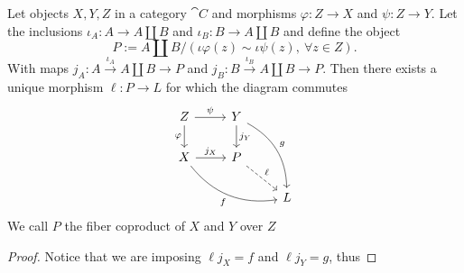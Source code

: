 \begin{proposition}
   Let objects \(X, Y, Z\) in a category \(\cat C\) and morphisms \(\varphi : Z
   \to X\) and \(\psi : Z \to Y\). Let the inclusions \(\iota_A : A \to A \amalg
   B\) and  \(\iota_B: B \to A \amalg B\) and define the object
    \[
       P := A \amalg B / (\iota  \varphi(z) \sim \iota  \psi(z),\
       \forall z \in Z).
   \]
   With maps \(j_A : A \xrightarrow{\iota_A} A \amalg B \to P\) and  \(j_B : B
   \xrightarrow{\iota_B} A \amalg B \to P\). Then there exists a unique morphism
    \(\ell : P \to L\) for which the diagram commutes
     \[
       \begin{tikzcd}
         Z
         \ar[r, "\psi"]
         \ar[d, swap, "\varphi"]
           &Y
           \ar[d, "j_Y"]
           \ar[ddr, bend left, "g"]
             &\\
         X
         \ar[r, "j_X"]
         \ar[drr, bend right, swap, "f"]
           &P
           \ar[dr, dashed, "\ell"]
             &\\
           &
             &L
       \end{tikzcd}
    \]
    We call \(P\) the fiber coproduct of \(X\) and \(Y\) over \(Z\)
\end{proposition}

\begin{proof}
   Notice that we are imposing \(\ell  j_X = f\) and \(\ell  j_Y =
   g\), thus
\end{proof}

